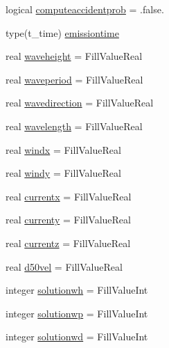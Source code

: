 \begin{DoxyCompactItemize}
\item 
logical \mbox{\hyperlink{structmodulelagrangianglobal_1_1t__partic_a6837cd287b8b1df825b6147ac0ea1fe9}{computeaccidentprob}} = .false.
\item 
type(t\+\_\+time) \mbox{\hyperlink{structmodulelagrangianglobal_1_1t__partic_aa7af7350db2f5e79cb57556cdef4b6fb}{emissiontime}}
\item 
real \mbox{\hyperlink{structmodulelagrangianglobal_1_1t__partic_ad39f362d5beb088748514157c1b0e650}{waveheight}} = Fill\+Value\+Real
\item 
real \mbox{\hyperlink{structmodulelagrangianglobal_1_1t__partic_a9118adf4aab4ce07ac9f795a3592b60e}{waveperiod}} = Fill\+Value\+Real
\item 
real \mbox{\hyperlink{structmodulelagrangianglobal_1_1t__partic_a84505ea6a79f8a403d23fc01e5d68544}{wavedirection}} = Fill\+Value\+Real
\item 
real \mbox{\hyperlink{structmodulelagrangianglobal_1_1t__partic_a21d4ec53404d08382152ed90bb2fff58}{wavelength}} = Fill\+Value\+Real
\item 
real \mbox{\hyperlink{structmodulelagrangianglobal_1_1t__partic_af55fc5f7e779e221614fc2880c020254}{windx}} = Fill\+Value\+Real
\item 
real \mbox{\hyperlink{structmodulelagrangianglobal_1_1t__partic_a95c46287ab7d9a1bdbb5f85ffe97811f}{windy}} = Fill\+Value\+Real
\item 
real \mbox{\hyperlink{structmodulelagrangianglobal_1_1t__partic_a91f2ef75e5abf0afee2cd131b327ab3b}{currentx}} = Fill\+Value\+Real
\item 
real \mbox{\hyperlink{structmodulelagrangianglobal_1_1t__partic_aeb8a1031a042982313c4456a0b3bf862}{currenty}} = Fill\+Value\+Real
\item 
real \mbox{\hyperlink{structmodulelagrangianglobal_1_1t__partic_a030b1777b50c54e03aff7922e71cdbb8}{currentz}} = Fill\+Value\+Real
\item 
real \mbox{\hyperlink{structmodulelagrangianglobal_1_1t__partic_a92dfb405246a3410f3cd497f7429000e}{d50vel}} = Fill\+Value\+Real
\item 
integer \mbox{\hyperlink{structmodulelagrangianglobal_1_1t__partic_a103e88215ea4b9bea47831c420987961}{solutionwh}} = Fill\+Value\+Int
\item 
integer \mbox{\hyperlink{structmodulelagrangianglobal_1_1t__partic_af32219dc1091882ac9674cb25bae0260}{solutionwp}} = Fill\+Value\+Int
\item 
integer \mbox{\hyperlink{structmodulelagrangianglobal_1_1t__partic_ab688fb459961e809e73ee4aca9bb741e}{solutionwd}} = Fill\+Value\+Int

\end{DoxyCompactItemize}
